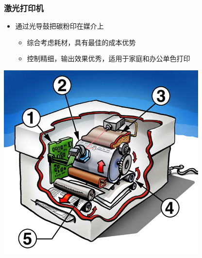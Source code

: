 \documentclass{beamer}
\newcommand{\fullPageImage}[2]{
	{
		\usebackgroundtemplate{\texttt{[image: \#1]}}
		\frame[plain]{#2}
	}
}
\begin{document}
\begin{frame}
	\frametitle{激光打印机}
	\begin{itemize}
		\item 通过光导鼓把碳粉印在媒介上
		\begin{itemize}
			\item 综合考虑耗材，具有最佳的成本优势
			\item 控制精细，输出效果优秀，适用于家庭和办公单色打印
		\end{itemize}
	\end{itemize}
	\begin{center}
	\includegraphics[height=.5\textheight]{images/laser-printer-principle.jpg}%
	\end{center}
\end{frame}

\fullPageImage{images/laserprinting.jpg}{\transwipe}
\end{document}
